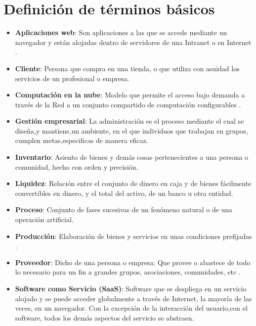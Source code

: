 \section{Definición de términos básicos}
\begin{itemize}
  \item \textbf{Aplicaciones web}: Son aplicaciones a las que se accede mediante un navegador y están
        alojadas dentro de servidores de una Intranet o en Internet \citep{nino}.
  \item \textbf{Cliente}: Persona que compra en una tienda, o que utiliza con asuidad los servicios
        de un profesional o empresa\citep{rae}.
  \item \textbf{Computación en la nube}: Modelo que permite el acceso bajo demanda a través
        de la Red a un conjunto compartido de computación configurables \citep{nist}.
  \item \textbf{Gestión empresarial}: La administración es el proceso mediante el cual
        se diseña,y mantiene,un ambiente, en el que individuos que trabajan en grupos,
        cumplen metas,especificas de manera eficaz\citep{koontz}.
  \item \textbf{Inventario}: Asiento de bienes y demás cosas pertenecientes a una persona o
        comunidad, hecho con orden y precisión\citep{rae}.
  \item \textbf{Liquidez}: Relación entre el conjunto de dinero en caja y de bienes fácilmente
        convertibles en dinero, y el total del activo, de un banco u otra
        entidad\citep{rae}.
  \item \textbf{Proceso}: Conjunto de fases sucesivas de un fenómeno natural o de una
        operación artificial\citep{rae}.
  \item \textbf{Producción}: Elaboración de bienes y servicios en unas condiciones prefijadas \citep{carro}.
  \item \textbf{Proveedor}: Dicho de una persona o empresa: Que provee o abastece de todo lo necesario
        para un fin a grandes grupos, asociaciones, comunidades, etc \citep{rae}.
  \item \textbf{Software como Servicio (SaaS)}: Software que se despliega en un servicio alojado y se
        puede acceder globalmente a través de Internet, la mayoría de las veces,
        en un navegador. Con la excepción de la interacción del usuario,con el
        software, todos los demás aspectos del servicio se abstraen\citep{sosinsky}.
\end{itemize}
